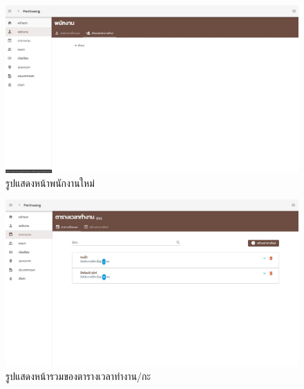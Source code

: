 \begin{figure}
  \begin{center}
    \includegraphics[width=14cm,keepaspectratio]{./images/new_employee.jpg}
  \end{center}
  \caption[รูปแสดงหน้าพนักงานใหม่]{รูปแสดงหน้าพนักงานใหม่} 
  \label{fig:new_employee}
\end{figure}

\begin{figure}
  \begin{center}
    \includegraphics[width=14cm,keepaspectratio]{./images/slot.jpg}
  \end{center}
  \caption[รูปแสดงหน้ารวมของตารางเวลาทำงาน/กะ]{รูปแสดงหน้ารวมของตารางเวลาทำงาน/กะ} 
  \label{fig:slot}
\end{figure}
 
